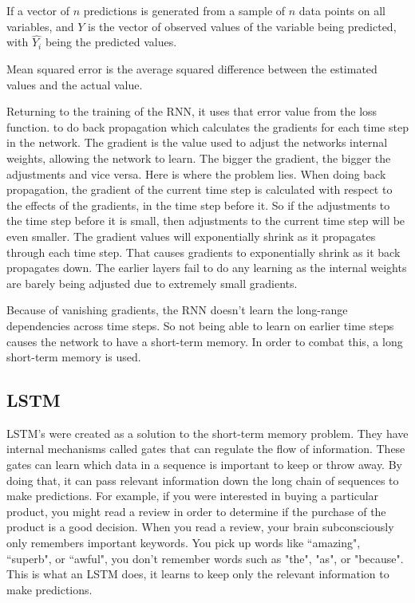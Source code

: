 If  a vector of $n$ predictions is generated from a sample of $n$ data points on all variables, and $Y$ is the vector of observed values of the variable being predicted, with $\hat{Y_i}$ being the predicted values.

\begin{definition}
Mean squared error is the average squared difference between the estimated values and the actual value.
\end{definition}

Returning to the training of the RNN, it uses that error value from the loss function. to do back propagation which calculates the gradients for each time step in the network. The gradient is the value used to adjust the networks internal weights, allowing the network to learn. The bigger the gradient, the bigger the adjustments and vice versa. Here is where the problem lies. When doing back propagation, the gradient of the current time step is calculated with respect to the effects of the gradients, in the time step before it. So if the adjustments to the time step before it is small, then adjustments to the current time step will be even smaller.  The gradient values will exponentially shrink as it propagates through each time step. That causes gradients to exponentially shrink as it back propagates down. The earlier layers fail to do any learning as the internal weights are barely being adjusted due to extremely small gradients.

Because of vanishing gradients, the RNN doesn’t learn the long-range dependencies across time steps. So not being able to learn on earlier time steps causes the network to have a short-term memory. In order to combat this, a long short-term memory is used\cite{intro_rnn}.

\subsection{LSTM}
LSTM's were created as a solution to the short-term memory problem. They have internal mechanisms called gates that can regulate the flow of information. These gates can learn which data in a sequence is important to keep or throw away. By doing that, it can pass relevant information down the long chain of sequences to make predictions. For example, if you were interested in buying a particular product, you might read a review in order to determine if the purchase of the product is a good decision. When you read a review, your brain subconsciously only remembers important keywords. You pick up words like ``amazing", ``superb", or ``awful", you don't remember words such as "the", "as", or "because". This is what an LSTM does, it learns to keep only the relevant information to make predictions.

